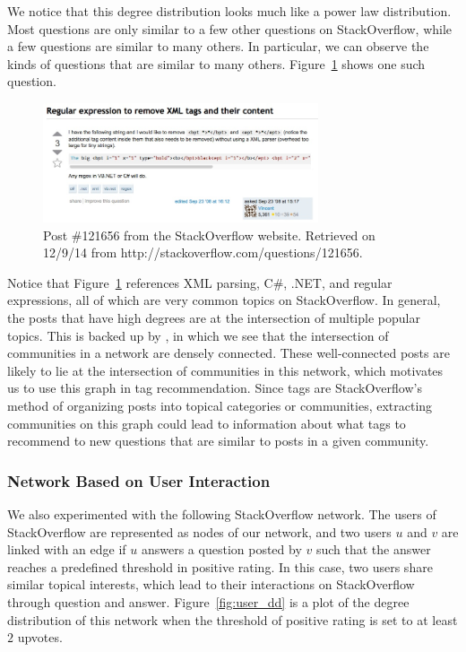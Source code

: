 \documentclass[10pt]{IEEEtran}
\begin{document}
We notice that this degree distribution looks much like a power law distribution. Most questions are only similar to a few other questions on StackOverflow, while a few questions are similar to many others. In particular, we can observe the kinds of questions that are similar to many others. Figure~\ref{fig:q_so} shows one such question.

\begin{figure}[h]
  \centering
    \includegraphics[width=3.2in]{question_so.jpg}
  \caption{Post \#121656 from the StackOverflow website. Retrieved on 12/9/14 from http://stackoverflow.com/questions/121656.}
  \label{fig:q_so}
\end{figure}

Notice that Figure~\ref{fig:q_so} references XML parsing, C\#, .NET, and regular expressions, all of which are very common topics on StackOverflow. In general, the posts that have high degrees are at the intersection of multiple popular topics. This is backed up by \cite{8}, in which we see that the intersection of communities in a network are densely connected. These well-connected posts are likely to lie at the intersection of communities in this network, which motivates us to use this graph in tag recommendation. Since tags are StackOverflow’s method of organizing posts into topical categories or communities, extracting communities on this graph could lead to information about what tags to recommend to new questions that are similar to posts in a given community.

\subsubsection{Network Based on User Interaction}

We also experimented with the following StackOverflow network. The users of StackOverflow are represented as nodes of our network, and two users $u$ and $v$ are linked with an edge if $u$ answers a question posted by $v$ such that the answer reaches a predefined threshold in positive rating. In this case, two users share similar topical interests, which lead to their interactions on StackOverflow through question and answer. Figure~\ref{fig:user_dd} is a plot of the degree distribution of this network when the threshold of positive rating is set to at least $2$ upvotes.
\end{document}
